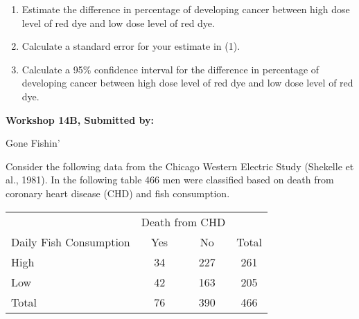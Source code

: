 \documentclass[11pt]{book}\usepackage[]{graphicx}\usepackage[]{color}
\begin{document}
\begin{exercises}
\begin{exercise}
\begin{enumerate}
  \item Estimate the difference in percentage of developing cancer between high dose level of red dye and low dose level of red dye.
  \item Calculate a standard error for your estimate in (1).
  \item Calculate a 95\% confidence interval for the difference in percentage of developing cancer between high dose level of red dye and low dose level of red dye.
\end{enumerate}

\end{exercise}
\begin{solution}  %

\end{solution}

\clearpage

    \begin{exercise}  %

    \begin{center}
\begin{flushleft}\textbf{\large \hfill Workshop 14B, Submitted by: }\end{flushleft}

\end{center}

Gone Fishin'

Consider the following data from the Chicago Western Electric Study (Shekelle et al., 1981). In the following table 466 men were classified based on death from coronary heart disease (CHD) and fish consumption.

\begin{center}
\begin{tabular}{@{} lccc @{}} \hline
& \multicolumn{2}{c}{Death from CHD} \\
Daily Fish Consumption &	Yes &	No &	Total \\ \hline
High &	34 &	227 &	261 \\
Low	& 42 &	163 &	205 \\ \hline
Total &	76 &	390 &	466 \\ \hline
\end{tabular}
\end{center}


\end{exercise}
\end{exercises}
\end{document}
